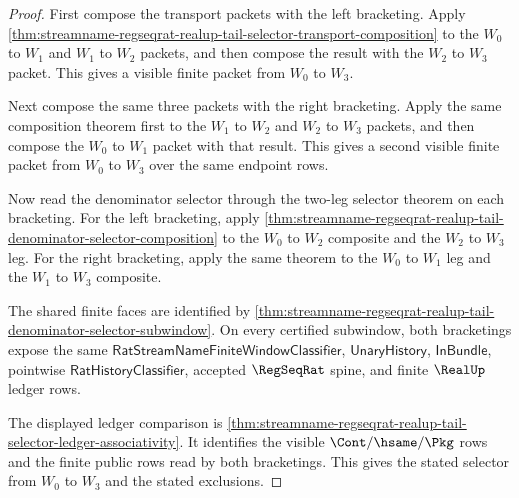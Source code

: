 \begin{proof}
First compose the transport packets with the left bracketing. Apply
\autoref{thm:streamname-regseqrat-realup-tail-selector-transport-composition}
to the $W_0$ to $W_1$ and $W_1$ to $W_2$ packets, and then compose the result
with the $W_2$ to $W_3$ packet. This gives a visible finite packet from $W_0$
to $W_3$.

Next compose the same three packets with the right bracketing. Apply the same
composition theorem first to the $W_1$ to $W_2$ and $W_2$ to $W_3$ packets,
and then compose the $W_0$ to $W_1$ packet with that result. This gives a
second visible finite packet from $W_0$ to $W_3$ over the same endpoint rows.

Now read the denominator selector through the two-leg selector theorem on each
bracketing. For the left bracketing, apply
\autoref{thm:streamname-regseqrat-realup-tail-denominator-selector-composition}
to the $W_0$ to $W_2$ composite and the $W_2$ to $W_3$ leg. For the right
bracketing, apply the same theorem to the $W_0$ to $W_1$ leg and the
$W_1$ to $W_3$ composite.

The shared finite faces are identified by
\autoref{thm:streamname-regseqrat-realup-tail-denominator-selector-subwindow}.
On every certified subwindow, both bracketings expose the same
$\mathsf{RatStreamNameFiniteWindowClassifier}$, $\mathsf{UnaryHistory}$,
$\mathsf{InBundle}$, pointwise $\mathsf{RatHistoryClassifier}$, accepted
$\RegSeqRat$ spine, and finite $\RealUp$ ledger rows.

The displayed ledger comparison is
\autoref{thm:streamname-regseqrat-realup-tail-selector-ledger-associativity}.
It identifies the visible $\Cont/\hsame/\Pkg$ rows and the finite public rows
read by both bracketings. This gives the stated selector from $W_0$ to $W_3$
and the stated exclusions.
\end{proof}

